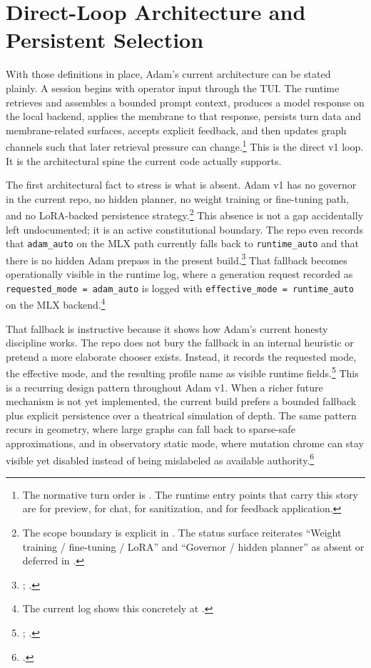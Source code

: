 \documentclass[10pt]{article}
\begin{document}
\section{Direct-Loop Architecture and Persistent Selection}

With those definitions in place, Adam's current architecture can be stated plainly. A session begins with operator input through the TUI. The runtime retrieves and assembles a bounded prompt context, produces a model response on the local backend, applies the membrane to that response, persists turn data and membrane-related surfaces, accepts explicit feedback, and then updates graph channels such that later retrieval pressure can change.\footnote{The normative turn order is . The runtime entry points that carry this story are  for preview,  for chat,  for sanitization, and  for feedback application.} This is the direct v1 loop. It is the architectural spine the current code actually supports.

The first architectural fact to stress is what is absent. Adam v1 has no governor in the current repo, no hidden planner, no weight training or fine-tuning path, and no LoRA-backed persistence strategy.\footnote{The scope boundary is explicit in . The status surface reiterates ``Weight training / fine-tuning / LoRA'' and ``Governor / hidden planner'' as absent or deferred in .} This absence is not a gap accidentally left undocumented; it is an active constitutional boundary. The repo even records that \texttt{adam\_auto} on the MLX path currently falls back to \texttt{runtime\_auto} and that there is no hidden Adam prepass in the present build.\footnote{; .} That fallback becomes operationally visible in the runtime log, where a generation request recorded as \texttt{requested\_mode = adam\_auto} is logged with \texttt{effective\_mode = runtime\_auto} on the MLX backend.\footnote{The current log shows this concretely at .}

That fallback is instructive because it shows how Adam's current honesty discipline works. The repo does not bury the fallback in an internal heuristic or pretend a more elaborate chooser exists. Instead, it records the requested mode, the effective mode, and the resulting profile name as visible runtime fields.\footnote{; .} This is a recurring design pattern throughout Adam v1. When a richer future mechanism is not yet implemented, the current build prefers a bounded fallback plus explicit persistence over a theatrical simulation of depth. The same pattern recurs in geometry, where large graphs can fall back to sparse-safe approximations, and in observatory static mode, where mutation chrome can stay visible yet disabled instead of being mislabeled as available authority.\footnote{.}
\end{document}

